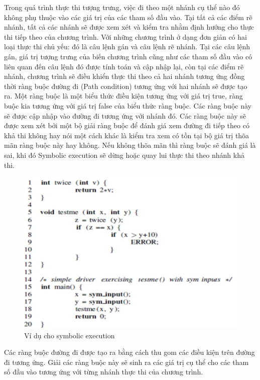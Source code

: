 \documentclass[12pt,a4paper]{article}
\begin{document}
\indent Trong quá trình thực thi tượng trưng, việc đi theo một nhánh cụ thể nào đó không phụ thuộc vào các giá trị của các tham số đầu vào. Tại tất cả các điểm rẽ nhánh, tất cả các nhánh sẽ được xem xét và kiểm tra nhằm định hướng cho thực thi tiếp theo của chương trình. Với những chương trình ở dạng đơn giản có hai loại thực thi chủ yếu: đó là câu lệnh gán và câu lệnh rẽ nhánh. Tại các câu lệnh gán, giá trị tượng trưng của biến chương trình cũng như các tham số đầu vào có liên quan đến câu lệnh đó được tính toán và cập nhập lại, còn tại các điểm rẽ nhánh, chương trình sẽ điều khiển thực thi theo cả hai nhánh tương ứng đồng thời ràng buộc đường đi (Path condition) tương ứng với hai nhánh sẽ được tạo ra. Một ràng buộc là một biểu thức điều kiện tương ứng với giá trị true, ràng buộc kia tương ứng với giá trị false của biểu thức ràng buộc. Các ràng buộc này sẽ được cập nhập vào đường đi tương ứng với nhánh đó. Các ràng buộc này sẽ được xem xét bởi một bộ giải ràng buộc để đánh giá xem đường đi tiếp theo có khả thi không hay nói một cách khác là kiểm tra xem có tồn tại bộ giá trị thõa mãn ràng buộc này hay không. Nếu không thõa mãn thì ràng buộc sẽ đánh giá là sai, khi đó Symbolic execution sẽ dừng hoặc quay lui thực thi theo nhánh khả thi.

\begin{figure}[ht]
\begin{center}
\includegraphics[scale=0.7]{hinhanh/hinh1}
\end{center}
\caption{Ví dụ cho symbolic execution}
\label{refhinh1}
\end{figure}

\indent Các ràng buộc đường đi được tạo ra bằng cách thu gom các điều kiện trên đường đi tương ứng. Giải các ràng buộc này sẽ sinh ra các giá trị cụ thể cho các tham số đầu vào tương ứng với từng nhánh thực thi của chương trình.
\end{document}
